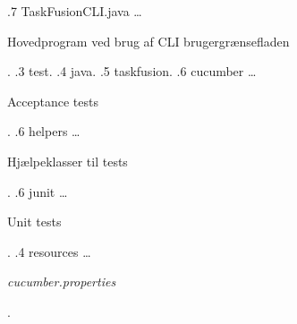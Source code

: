 \begin{figure}[H]
{        .7 TaskFusionCLI.java \ldots{} \begin{minipage}[t]{5cm} Hovedprogram ved brug af CLI brugergrænsefladen \end{minipage}.
        .3 test.
        .4 java.
        .5 taskfusion.
        .6 cucumber \ldots{} \begin{minipage}[t]{5cm} Acceptance tests \end{minipage}.
        .6 helpers \ldots{} \begin{minipage}[t]{5cm} Hjælpeklasser til tests \end{minipage}.
        .6 junit \ldots{} \begin{minipage}[t]{5cm} Unit tests \end{minipage}.
        .4 resources \ldots{} \begin{minipage}[t]{5cm} \emph{cucumber.properties} \end{minipage}.
    }
\end{figure}
